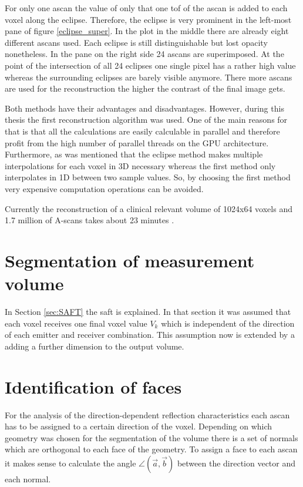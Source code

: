 For only one \ac{ascan} the value of only that one \ac{tof} of the \ac{ascan} is added to each voxel along the eclipse. Therefore, the eclipse is very prominent in the left-most pane of figure \ref{eclipse_super}. In the plot in the middle there are already eight different \acp{ascan} used. Each eclipse is still distinguishable but lost opacity nonetheless.
In the pane on the right side 24 \acp{ascan} are superimposed. At the point of the intersection of all 24 eclipses one single pixel has a rather high value whereas the surrounding eclipses are barely visible anymore. There more \acp{ascan} are used for the reconstruction the higher the contrast of the final image gets.

\bigskip

Both methods have their advantages and disadvantages. However, during this thesis the first reconstruction algorithm was used. One of the main reasons for that is that all the calculations are easily calculable in parallel and therefore profit from the high number of parallel threads on the GPU architecture. Furthermore, as was mentioned that the eclipse method makes multiple interpolations for each voxel in 3D necessary whereas the first method only interpolates in 1D between two sample values. So, by choosing the first method very expensive computation operations can be avoided.


Currently the reconstruction of a clinical relevant volume of 1024x64 voxels and 1.7 million of A-scans takes about 23 minutes \cite{Kretzek2014GPUAberration}.




\section{Segmentation of measurement volume}
In Section \ref{sec:SAFT} the \ac{saft} is explained. In that section it was assumed that each voxel receives one final voxel value $V_k$ which is independent of the direction of each emitter and receiver combination.
This assumption now is extended by a adding a further dimension to the output volume.











\section{Identification of faces}
For the analysis of the direction-dependent reflection characteristics each \ac{ascan} has to be assigned to a certain direction of the voxel.
Depending on which geometry was chosen for the segmentation of the volume there is a set of normals which are orthogonal to each face of the geometry. To assign a face to each \ac{ascan} it makes sense to calculate the angle $\angle (\overrightarrow{a},\overrightarrow{b})$ between the direction vector and each normal.


